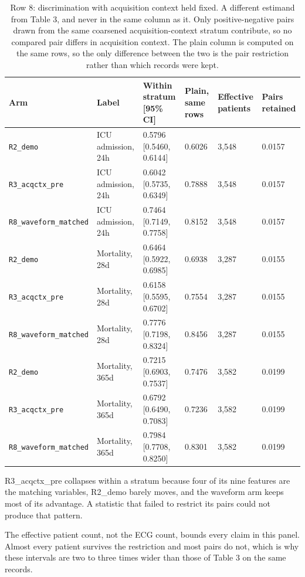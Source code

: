 \begin{table}[t]
\centering
\small
\caption{Row 8: discrimination with acquisition context held fixed. A different estimand from Table 3, and never in the same column as it. Only positive-negative pairs drawn from the same coarsened acquisition-context stratum contribute, so no compared pair differs in acquisition context. The plain column is computed on the same rows, so the only difference between the two is the pair restriction rather than which records were kept.}
\label{tab:row8}
\begin{tabular}{llllll}
\toprule
Arm & Label & Within stratum [95\% CI] & Plain, same rows & Effective patients & Pairs retained \\
\midrule
\texttt{R2\_demo} & ICU admission, 24h & 0.5796 [0.5460, 0.6144] & 0.6026 & 3,548 & 0.0157 \\
\texttt{R3\_acqctx\_pre} & ICU admission, 24h & 0.6042 [0.5735, 0.6349] & 0.7888 & 3,548 & 0.0157 \\
\texttt{R8\_waveform\_matched} & ICU admission, 24h & 0.7464 [0.7149, 0.7758] & 0.8152 & 3,548 & 0.0157 \\
\texttt{R2\_demo} & Mortality, 28d & 0.6464 [0.5922, 0.6985] & 0.6938 & 3,287 & 0.0155 \\
\texttt{R3\_acqctx\_pre} & Mortality, 28d & 0.6158 [0.5595, 0.6702] & 0.7554 & 3,287 & 0.0155 \\
\texttt{R8\_waveform\_matched} & Mortality, 28d & 0.7776 [0.7198, 0.8324] & 0.8456 & 3,287 & 0.0155 \\
\texttt{R2\_demo} & Mortality, 365d & 0.7215 [0.6903, 0.7537] & 0.7476 & 3,582 & 0.0199 \\
\texttt{R3\_acqctx\_pre} & Mortality, 365d & 0.6792 [0.6490, 0.7083] & 0.7236 & 3,582 & 0.0199 \\
\texttt{R8\_waveform\_matched} & Mortality, 365d & 0.7984 [0.7708, 0.8250] & 0.8301 & 3,582 & 0.0199 \\
\bottomrule
\end{tabular}
\par\footnotesize R3\_acqctx\_pre collapses within a stratum because four of its nine features are the matching variables, R2\_demo barely moves, and the waveform arm keeps most of its advantage. A statistic that failed to restrict its pairs could not produce that pattern.
\par\footnotesize The effective patient count, not the ECG count, bounds every claim in this panel. Almost every patient survives the restriction and most pairs do not, which is why these intervals are two to three times wider than those of Table 3 on the same records.
\end{table}

